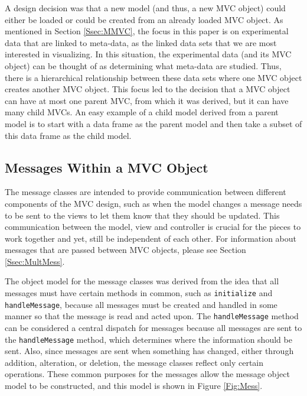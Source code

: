 \documentclass{article}[11pt]
\newcommand{\Rfunction}[1]{{\texttt{#1}}}
\begin{document}
A design decision was that a new model (and thus, a new MVC object) could
either be loaded or could be created from an already loaded MVC object.  As
mentioned in Section \ref{Ssec:MMVC}, the focus in this paper is on
experimental data that are linked to meta-data, as the linked data sets that we
are most interested in visualizing.  In this situation, the experimental data
(and its MVC object) can be thought of as determining what meta-data are
studied.  Thus, there is a hierarchical relationship between these data sets
where one MVC object creates another MVC object.  This focus led to the
decision that a MVC object can have at most one parent MVC, from which it was
derived, but it can have many child MVCs.  An easy example of a child model
derived from a parent model is to start with a data frame as the parent model
and then take a subset of this data frame as the child model.  

\subsection{Messages Within a MVC Object}\label{Ssec:OneMess}

The message classes are intended to provide communication between different
components of the MVC design, such as when the model changes a message needs to
be sent to the views to let them know that they should be updated.  This
communication between the model, view and controller is crucial for the pieces
to work together and yet, still be independent of each other.  For information
about messages that are passed between MVC objects, please see Section
\ref{Ssec:MultMess}.

The object model for the message classes was derived from the idea that all
messages must have certain methods in common, such as \Rfunction{initialize}
and \Rfunction{handleMessage}, because all messages must be created and
handled in some manner so that the message is read and acted upon.  The
\Rfunction{handleMessage} method can be considered a central dispatch for
messages because all messages are sent to the \Rfunction{handleMessage}
method, which determines where the information should be sent.   Also,
since messages are sent when something has changed, either through addition,
alteration, or deletion, the message classes reflect only certain operations.
These common purposes for the messages allow the message object model to be
constructed, and this model is shown in Figure \ref{Fig:Mess}.
\end{document}

